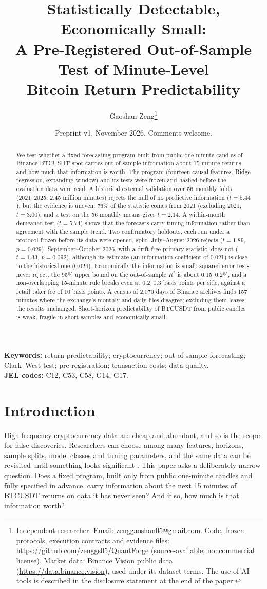 \documentclass[11pt]{article}
\title{Statistically Detectable, Economically Small:\\
A Pre-Registered Out-of-Sample Test of Minute-Level\\ Bitcoin Return Predictability}
\author{Gaoshan Zeng\thanks{Independent researcher. Email: zenggaoshan05@gmail.com. Code, frozen protocols, execution contracts and evidence files: \url{https://github.com/zenggs05/QuantForge} (source-available; noncommercial license). Market data: Binance Vision public data (\url{https://data.binance.vision}), used under its dataset terms. The use of AI tools is described in the disclosure statement at the end of the paper.}}
\date{Preprint v1, November 2026. Comments welcome.}
\begin{document}
\maketitle

\begin{abstract}
\noindent
We test whether a fixed forecasting program built from public one-minute candles of Binance BTCUSDT spot carries out-of-sample information about 15-minute returns, and how much that information is worth. The program (fourteen causal features, Ridge regression, expanding window) and its tests were frozen and hashed before the evaluation data were read. A historical external validation over 56 monthly folds (2021--2025, 2.45 million minutes) rejects the null of no predictive information ($t=5.44$), but the evidence is uneven: 76\% of the statistic comes from 2021 (excluding 2021, $t=3.00$), and a test on the 56 monthly means gives $t=2.14$. A within-month demeaned test ($t=5.74$) shows that the forecasts carry timing information rather than agreement with the sample trend. Two confirmatory holdouts, each run under a protocol frozen before its data were opened, split. July--August 2026 rejects ($t=1.89$, $p=0.029$). September--October 2026, with a drift-free primary statistic, does not ($t=1.33$, $p=0.092$), although its estimate (an information coefficient of 0.021) is close to the historical one (0.024). Economically the information is small: squared-error tests never reject, the 95\% upper bound on the out-of-sample $R^2$ is about 0.15--0.2\%, and a non-overlapping 15-minute rule breaks even at 0.2--0.3 basis points per side, against a retail taker fee of 10 basis points. A census of 2,070 days of Binance archives finds 157 minutes where the exchange's monthly and daily files disagree; excluding them leaves the results unchanged. Short-horizon predictability of BTCUSDT from public candles is weak, fragile in short samples and economically small.
\end{abstract}

\medskip
\noindent\textbf{Keywords:} return predictability; cryptocurrency; out-of-sample forecasting; Clark--West test; pre-registration; transaction costs; data quality.\\
\noindent\textbf{JEL codes:} C12, C53, C58, G14, G17.

\newpage
\section{Introduction}

High-frequency cryptocurrency data are cheap and abundant, and so is the scope for false discoveries. Researchers can choose among many features, horizons, sample splits, model classes and tuning parameters, and the same data can be revisited until something looks significant \citep{white2000,harvey2016,harvey2017}. This paper asks a deliberately narrow question. Does a fixed program, built only from public one-minute candles and fully specified in advance, carry information about the next 15 minutes of BTCUSDT returns on data it has never seen? And if so, how much is that information worth?
\end{document}
